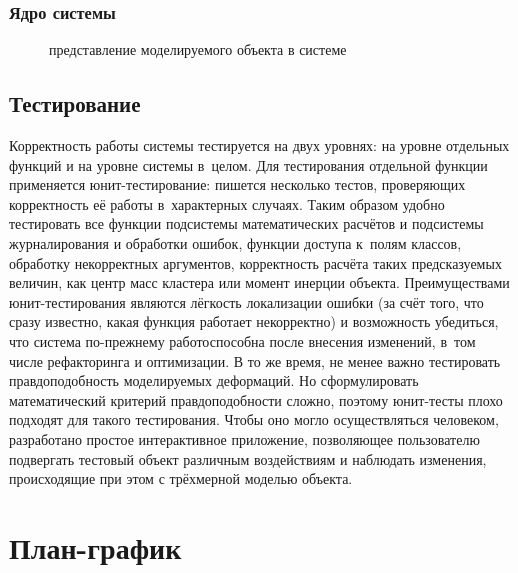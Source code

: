 \documentclass[a4paper, 14pt, titlepage]{extarticle}
\newcommand{\includefigure}[2]{
    \begin{figure}[!htb]
      \center{\texttt{[image: \#1]}}
      \caption{#2} \label{fig:#1}
    \end{figure}
  }
\begin{document}
    \subsubsection{Ядро системы}
        \includefigure{core-vertices}{представление моделируемого объекта в системе}

    \subsection{Тестирование}

      Корректность работы системы тестируется на двух уровнях: на уровне отдельных функций и на
      уровне системы в~целом. Для тестирования отдельной функции применяется юнит-тестирование:
      пишется несколько тестов, проверяющих корректность её работы в~характерных случаях. Таким
      образом удобно тестировать все функции подсистемы математических расчётов и подсистемы
      журналирования и обработки ошибок, функции доступа к~полям классов, обработку некорректных
      аргументов, корректность расчёта таких предсказуемых величин, как центр масс кластера или
      момент инерции объекта. Преимуществами юнит-тестирования являются лёгкость локализации ошибки
      (за счёт того, что сразу известно, какая функция работает некорректно) и возможность
      убедиться, что система по-прежнему работоспособна после внесения изменений, в~том числе
      рефакторинга и оптимизации. В то же время, не менее важно тестировать правдоподобность
      моделируемых деформаций. Но сформулировать математический критерий правдоподобности сложно,
      поэтому юнит-тесты плохо подходят для такого тестирования. Чтобы оно могло осуществляться
      человеком, разработано простое интерактивное приложение, позволяющее пользователю подвергать
      тестовый объект различным воздействиям и наблюдать изменения, происходящие при этом с
      трёхмерной моделью объекта.

  \section{План-график}
\end{document}
